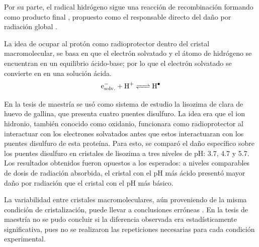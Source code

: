 Por su parte, el radical hidrógeno sigue una reacción de recombinación formando como producto final , propuesto como el responsable directo del daño por radiación global .

La idea de ocupar al protón como radioprotector dentro del cristal macromolecular, se basa en que el electrón solvatado y el átomo de hidrógeno se encuentran en un equilibrio ácido-base; por lo que el electrón solvatado se convierte en  en una solución ácida. %
\begin{equation}
\ce{e^{-}_{solv.} + H^{+} <=> H^{.}}
\end{equation}

En la tesis de maestría se usó como sistema de estudio la lisozima de clara de huevo de gallina, que presenta cuatro puentes disulfuro. La idea era que el ion hidronio, también conocido como oxidanio, funcionara como radioprotector al interactuar con los electrones solvatados antes que estos interactuaran con los puentes disulfuro de esta proteína. Para esto, se comparó el daño específico sobre los puentes disulfuro en cristales de lisozima a tres niveles de pH: \num{3.7}, \num{4.7} y \num{5.7}. Los resultados obtenidos fueron opuestos a los esperados: a niveles comparables de dosis de radiación absorbida, el cristal con el pH más ácido presentó mayor daño por radiación que el cristal con el pH más básico.

La variabilidad entre cristales macromoleculares, aún proveniendo de la misma condición de cristalización, puede llevar a conclusiones erróneas . En la tesis de maestría no se pudo concluir si la diferencia observada era estadísticamente significativa, pues no se realizaron las repeticiones necesarias para cada condición experimental.


